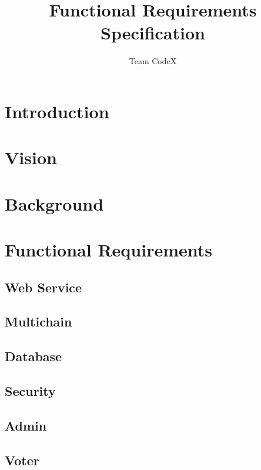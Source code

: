\documentclass[11pt]{article}
\author{Team CodeX}
\title{Functional Requirements Specification}
\begin{document}
	\setlength{\parskip}{6pt}
	
	
	
	\tableofcontents
	\newpage
	
	\listoffigures
	\newpage
	
	\section{Introduction}
		
	
	\section{Vision}
		
	
	\section{Background}
		
		\newpage
		
	\section{Functional Requirements}

	\subsection{Web Service}
		
		\newpage
		
	\subsection{Multichain}
		
		\newpage
		
	\subsection{Database}
		
		\newpage
		
	\subsection{Security}
		
		\newpage
		
	\subsection{Admin}
		
		\newpage
		
	\subsection{Voter}
		
		\newpage
		
\end{document}
